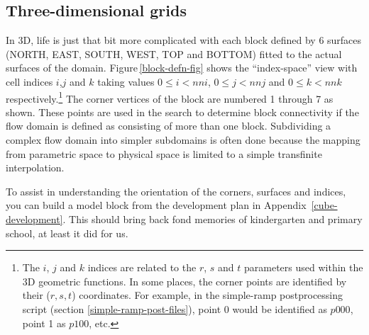 \subsection{Three-dimensional grids}
\label{block3d-sec}
%
In 3D, life is just that bit more complicated with
each block defined by 6 surfaces (NORTH, EAST, SOUTH, WEST, TOP and BOTTOM) 
fitted to the actual surfaces of the domain.
Figure\,\ref{block-defn-fig} shows the ``index-space'' view with cell indices
$i$,$j$ and $k$ taking values $0 \le i < nni$, $0 \le j < nnj$ and 
$0 \le k < nnk$ respectively.\footnote{
  The $i$, $j$ and $k$ indices are related to the $r$, $s$ and $t$ parameters
  used within the 3D geometric functions.
  In some places, the corner points are identified by their ($r,s,t$)
  coordinates.
  For example, in the simple-ramp postprocessing script (section
  \ref{simple-ramp-post-files}), point 0 would be identified as $p000$, point 1
  as $p100$, etc.}
The corner vertices of the block are numbered 1 through 7 as shown.
These points are used in the search to determine block connectivity if the
flow domain is defined as consisting of more than one block.
Subdividing a complex flow domain into simpler subdomains is often done
because the mapping from parametric space to physical space is limited to a
simple transfinite interpolation.

\medskip
To assist in understanding the orientation of the corners, surfaces and indices,
you can build a model block from the development plan in Appendix~\ref{cube-development}.
This should bring back fond memories of kindergarten and primary school, 
at least it did for us.

